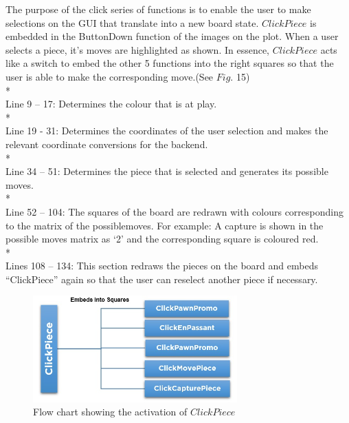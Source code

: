 \documentclass[11pt,a4paper]{article}
\begin{document}
The purpose of the click series of functions is to enable the user to make selections on the GUI that translate into a new board state.  $ClickPiece$ is embedded in the ButtonDown function of the images on the plot. When a user selects a piece, it’s moves are highlighted as shown. In essence, $ClickPiece$ acts like a switch to embed the other 5 functions into the right squares so that the user is able to make the corresponding move.(See $Fig.$ 15)
\\*\\
Line 9 – 17: Determines the colour that is at play.
\\*\\
Line 19 - 31: Determines the coordinates of the user selection and makes the relevant coordinate conversions for the backend.
\\*\\
Line 34 – 51: Determines the piece that is selected and generates its possible moves.
\\*\\
Line 52 – 104: The squares of the board are redrawn with colours corresponding to the matrix of the possiblemoves. For example: A capture is shown in the possible moves matrix as ‘2’ and the corresponding square is coloured red.
\\*\\
Lines 108 – 134: This section redraws the pieces on the board and embeds “ClickPiece” again so that the user can reselect another piece if necessary.\newline

\begin{figure}[H]
\centering
\includegraphics[width=0.7\textwidth]{flow_chart}
\caption{Flow chart showing the activation of $ClickPiece$}
\label{fig:chess1}
\end{figure}
\end{document}
